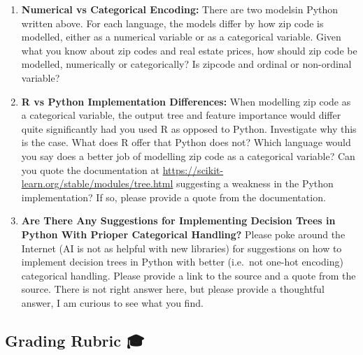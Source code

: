 \documentclass[
  letterpaper,
  DIV=11,
  numbers=noendperiod]{scrartcl}
\begin{document}
\begin{enumerate}
\def\labelenumi{\arabic{enumi}.}
\item
  \textbf{Numerical vs Categorical Encoding:} There are two modelsin
  Python written above. For each language, the models differ by how zip
  code is modelled, either as a numerical variable or as a categorical
  variable. Given what you know about zip codes and real estate prices,
  how should zip code be modelled, numerically or categorically? Is
  zipcode and ordinal or non-ordinal variable?
\item
  \textbf{R vs Python Implementation Differences:} When modelling zip
  code as a categorical variable, the output tree and feature importance
  would differ quite significantly had you used R as opposed to Python.
  Investigate why this is the case. What does R offer that Python does
  not? Which language would you say does a better job of modelling zip
  code as a categorical variable? Can you quote the documentation at
  \url{https://scikit-learn.org/stable/modules/tree.html} suggesting a
  weakness in the Python implementation? If so, please provide a quote
  from the documentation.
\item
  \textbf{Are There Any Suggestions for Implementing Decision Trees in
  Python With Prioper Categorical Handling?} Please poke around the
  Internet (AI is not as helpful with new libraries) for suggestions on
  how to implement decision trees in Python with better (i.e.~not
  one-hot encoding) categorical handling. Please provide a link to the
  source and a quote from the source. There is not right answer here,
  but please provide a thoughtful answer, I am curious to see what you
  find.
\end{enumerate}

\subsection{Grading Rubric 🎓}\label{grading-rubric}
\end{document}
